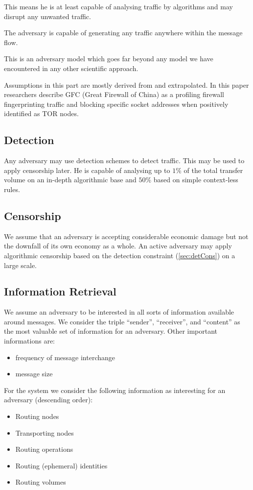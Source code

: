 \documentclass[9pt,journal,compsoc]{IEEEtran}
\begin{document}
This means he is at least capable of analysing traffic by algorithms and may disrupt any unwanted traffic.

The adversary is capable of generating any traffic anywhere within the message flow.

This is an adversary model which goes far beyond any model we have encountered in any other scientific approach.

Assumptions in this part are mostly derived from \cite{foci12-winter} and extrapolated. In this paper researchers describe GFC (Great Firewall of China) as a profiling firewall fingerprinting traffic and blocking specific socket addresses when positively identified as TOR nodes. 

\subsection{Detection\label{sec:detCons}}
Any adversary may use detection schemes to detect traffic. This may be used to apply censorship later. He is capable of analysing up to $1\%$ of the total transfer volume on an in-depth algorithmic base and $50\%$  based on simple context-less rules. 

\subsection{Censorship}
We assume that an adversary is accepting considerable economic damage but not the downfall of its own economy as a whole. An active adversary may apply algorithmic censorship based on the detection constraint (\ref{sec:detCons}) on a large scale.

\subsection{Information Retrieval}
We assume an adversary to be interested in all sorts of information available around messages. We consider the triple ``sender'', ``receiver'', and ``content'' as the most valuable set of information for an adversary. Other important informations are:

\begin{itemize}
	\item frequency of message interchange
	\item message size
\end{itemize}

For the system we consider the following information as interesting for an adversary (descending order):
\begin{itemize}
	\item Routing nodes
	\item Transporting nodes
	\item Routing operations
	\item Routing (ephemeral) identities
	\item Routing volumes
\end{itemize}
\end{document}
